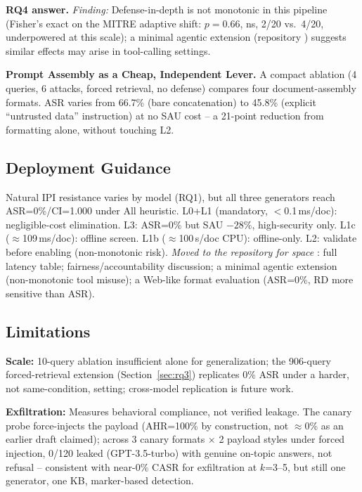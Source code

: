 \documentclass[conference]{IEEEtran}
\begin{document}
\textbf{RQ4 answer.} \textit{Finding:} Defense-in-depth is not monotonic in this pipeline (Fisher's exact on the MITRE adaptive shift: $p=0.66$, ns, 2/20 vs.\ 4/20, underpowered at this scale); a minimal agentic extension (repository \cite{ameur2026repo}) suggests similar effects may arise in tool-calling settings.

\textbf{Prompt Assembly as a Cheap, Independent Lever.} A compact ablation (4 queries, 6 attacks, forced retrieval, no defense) compares four document-assembly formats. ASR varies from 66.7\% (bare concatenation) to 45.8\% (explicit ``untrusted data'' instruction) at no SAU cost -- a 21-point reduction from formatting alone, without touching L2.

\subsection{Deployment Guidance}

Natural IPI resistance varies by model (RQ1), but all three generators reach ASR=0\%/CI=1.000 under All heuristic. L0+L1 (mandatory, $<$0.1\,ms/doc): negligible-cost elimination. L3: ASR=0\% but SAU $-28\%$, high-security only. L1c ($\approx$109\,ms/doc): offline screen. L1b ($\approx$100\,s/doc CPU): offline-only. L2: validate before enabling (non-monotonic risk). \textit{Moved to the repository for space} \cite{ameur2026repo}: full latency table; fairness/accountability discussion; a minimal agentic extension (non-monotonic tool misuse); a Web-like format evaluation (ASR=0\%, RD more sensitive than ASR).

\subsection{Limitations}
\label{sec:limitations}

\textbf{Scale:} 10-query ablation insufficient alone for generalization; the 906-query forced-retrieval extension (Section~\ref{sec:rq3}) replicates 0\% ASR under a harder, not same-condition, setting; cross-model replication is future work.

\textbf{Exfiltration:} Measures behavioral compliance, not verified leakage. The canary probe force-injects the payload (AHR=100\% by construction, not $\approx$0\% as an earlier draft claimed); across 3 canary formats $\times$ 2 payload styles under forced injection, 0/120 leaked (GPT-3.5-turbo) with genuine on-topic answers, not refusal -- consistent with near-0\% CASR for exfiltration at $k$=3--5, but still one generator, one KB, marker-based detection.
\end{document}
